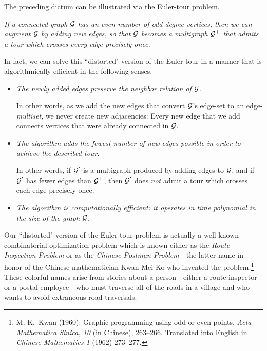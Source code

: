 \medskip

The preceding dictum can be illustrated via the Euler-tour problem.
\begin{description}
\item
{\em If a {\em connected} graph $\mbox{$\cal G$}$ has an {\em even number of odd-degree vertices}, then we can augment $\mbox{$\cal G$}$ by adding new edges, so that $\mbox{$\cal G$}$ becomes a {\em multigraph} $\mbox{$\cal G$}^+$ that admits a tour which crosses every edge precisely once.}
\end{description}
In fact, we can solve this ``distorted" version of the Euler-tour in a manner that is algorithmically efficient in the following senses.
\begin{itemize}
\item
{\em The newly added edges preserve the neighbor relation of $\mbox{$\cal G$}$.}

\smallskip

In other words, as we add the new edges that convert $\mbox{$\cal G$}$'s edge-set to an edge-{\em multiset}, we never create new adjacencies: Every new edge that we add connects vertices that were already connected in $\mbox{$\cal G$}$.

\item
{\em The algorithm adds the fewest number of new edges possible in order to achieve the described tour.}

\smallskip

In other words, if $\mbox{$\cal G$}'$ is a multigraph produced by adding edges to $\mbox{$\cal G$}$, and if $\mbox{$\cal G$}'$ has fewer edges than $\mbox{$\cal G$}^+$, then $\mbox{$\cal G$}'$ does {\em not} admit a tour which crosses each edge precisely once.
\item
{\em The algorithm is computationally efficient: it operates in time polynomial in the size of the graph $\mbox{$\cal G$}$.}
\end{itemize}

\medskip

  

Our ``distorted" version of the Euler-tour problem is actually a well-known combinatorial optimization problem which is known either as the {\it Route Inspection Problem} or as the {\it Chinese Postman Problem}---the latter name in honor of the Chinese mathematician Kwan Mei-Ko who invented the problem.\footnote{M.-K.~Kwan (1960): Graphic programming using odd or even points.  {\it Acta Mathematica Sinica, 10} (in Chinese), 263--266.  Translated into English in {\it Chinese Mathematics 1} (1962) 273--277.}  These colorful names arise from stories about a person---either a route inspector or a postal employee---who must traverse all of the roads in a village and who wants to avoid extraneous road traversals.

